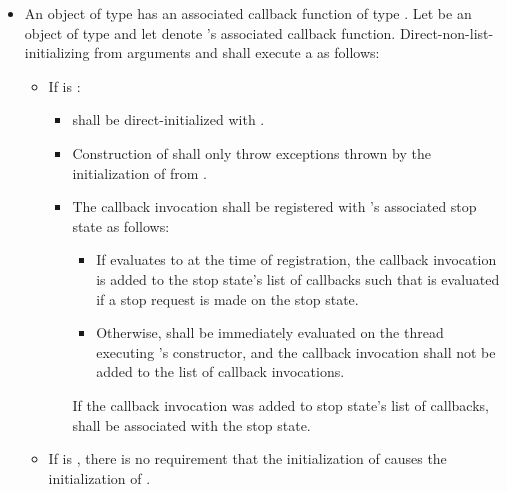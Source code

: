 \begin{itemize}
\item
An object of type  has
an associated callback function of type .
Let  be an object of type  and
let  denote 's associated callback function.
Direct-non-list-initializing  from
arguments  and 
shall execute a  as follows:
\begin{itemize}
\item
If  is :
\begin{itemize}
\item
{} shall be direct-initialized with .
\item
Construction of  shall only throw exceptions
thrown by the initialization of  from .
\item
The callback invocation 
shall be registered with 's associated stop state as follows:
\begin{itemize}
\item
If  evaluates to 
at the time of registration,
the callback invocation is added to the stop state's list of callbacks
such that  is evaluated
if a stop request is made on the stop state.
\item
Otherwise, 
shall be immediately evaluated
on the thread executing 's constructor, and
the callback invocation shall not be added to the list of callback invocations.
\end{itemize}
If the callback invocation was added to stop state's list of callbacks,
 shall be associated with the stop state.
\end{itemize}
\item
\begin{note}
If  is ,
there is no requirement
that the initialization of 
causes the initialization of .
\end{note}
\end{itemize}


\end{itemize}
